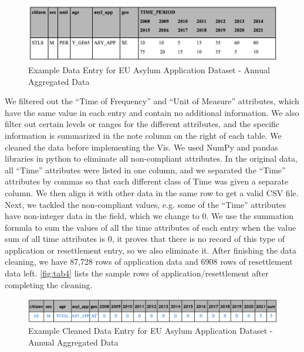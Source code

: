 \documentclass[journal]{vgtc}                %
\begin{document}
\begin{figure}[tb]
  \centering %
  \includegraphics[width=\columnwidth]{tab3.png}
  \caption{Example Data Entry for EU Asylum Application Dataset - Annual Aggregated Data}
  \label{fig:tab3}
 \end{figure}

We filtered out the “Time of Frequency” and “Unit of Measure” attributes, which have the same value in each entry and contain no additional information. We also filter out certain levels or ranges for the different attributes, and the specific information is summarized in the note column on the right of each table. We cleaned the data before implementing the Vis. We used NumPy and pandas libraries in python to eliminate all non-compliant attributes. In the original data, all “Time” attributes were listed in one column, and we separated the “Time” attributes by commas so that each different class of Time was given a separate column. We then align it with other data in the same row to get a valid CSV file. Next, we tackled the non-compliant values, e.g. some of the “Time” attributes have non-integer data in the field, which we change to 0. We use the summation formula to sum the values of all the time attributes of each entry when the value sum of all time attributes is 0, it proves that there is no record of this type of application or resettlement entry, so we also eliminate it. After finishing the data cleaning, we have 87,728 rows of application data and 6908 rows of resettlement data left. \autoref{fig:tab4} lists the sample rows of application/resettlement after completing the cleaning.

\begin{figure}[tb]
  \centering %
  \includegraphics[width=\columnwidth]{tab4.png}
  \caption{Example Cleaned Data Entry for EU Asylum Application Dataset - Annual Aggregated Data}
  \label{fig:tab4}
 \end{figure}
\end{document}

